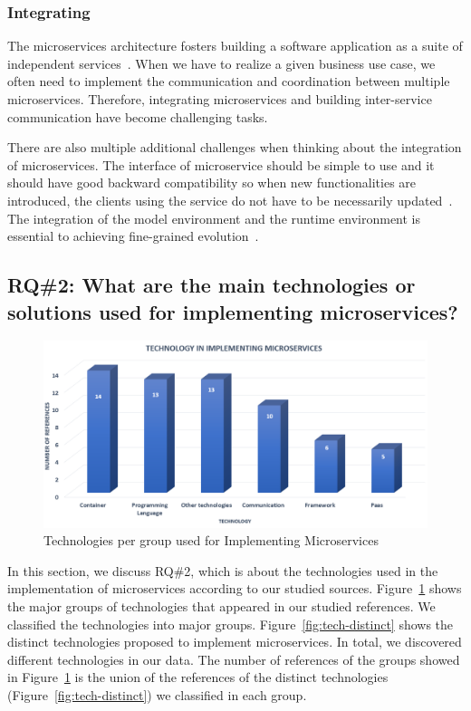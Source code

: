 \subsubsection{Integrating}%

The microservices architecture fosters building a software application as a suite of independent services~\cite{rosa2018}. When we have to realize a given business use case, we often need to implement the communication and coordination between multiple microservices. Therefore, integrating microservices and building inter-service communication have become challenging tasks.

There are also multiple additional challenges when thinking about the integration of microservices. The interface of microservice should be simple to use and it should have good backward compatibility so when new functionalities are introduced, the clients using the service do not have to be necessarily updated~\cite{liu2018, Zhang2019, Kalske2017paper}. The integration of the model environment and the runtime environment is essential to achieving fine-grained evolution~\cite{overeem2018}.




\subsection{RQ\#2: What are the main technologies or solutions used for implementing microservices?}\label{sec:results-rq2}

\begin{figure}[h]
	\centering
	\includegraphics[width=0.65\linewidth]{images/commtechother.png}
	\caption{Technologies per group used for Implementing Microservices}
	\label{fig:tech-group}
\end{figure}	

In this section, we discuss RQ\#2, which is about the technologies used in the implementation of microservices according to our studied sources. Figure~\ref{fig:tech-group} shows the major groups of technologies that appeared in our studied references. We classified the technologies into \techgroupcount major groups.
Figure~\ref{fig:tech-distinct} shows the distinct technologies proposed to implement microservices. In total, we discovered \techcount different technologies in our data. 
The number of references of the groups showed in Figure~\ref{fig:tech-group} is the union of the references of the distinct technologies (Figure~\ref{fig:tech-distinct}) we classified in each group.  

